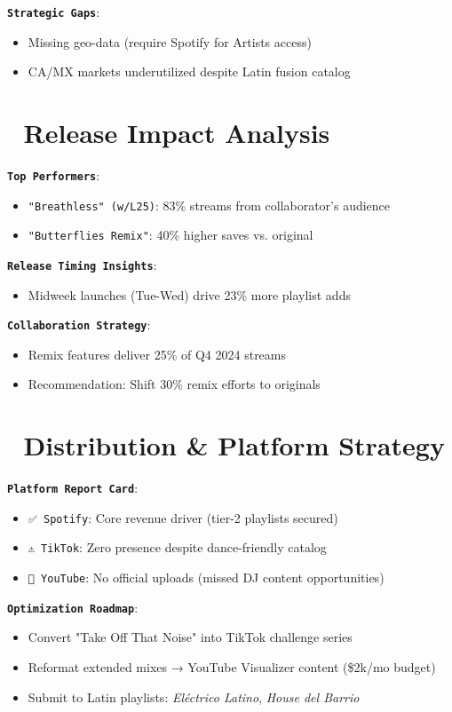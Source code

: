 \documentclass{article}
\begin{document}
\texttt{\textbf{Strategic Gaps}}:  
\begin{itemize}  
\item Missing geo-data (require Spotify for Artists access)  
\item CA/MX markets underutilized despite Latin fusion catalog  
\end{itemize}  

\section*{\normalsize 🎵 Release Impact Analysis}  
\texttt{\textbf{Top Performers}}:  
\begin{itemize}  
\item \texttt{"Breathless" (w/L25)}: 83\% streams from collaborator's audience  
\item \texttt{"Butterflies Remix"}: 40\% higher saves vs. original  
\end{itemize}  

\texttt{\textbf{Release Timing Insights}}:  
\begin{itemize}  
item Summer releases (Jun-Jul) sustain +18\% longer than fall drops  
\item Midweek launches (Tue-Wed) drive 23\% more playlist adds  
\end{itemize}  

\texttt{\textbf{Collaboration Strategy}}:  
\begin{itemize}  
\item Remix features deliver 25\% of Q4 2024 streams  
\item Recommendation: Shift 30\% remix efforts to originals  
\end{itemize}  

\section*{\normalsize 📱 Distribution \& Platform Strategy}  
\texttt{\textbf{Platform Report Card}}:  
\begin{itemize}  
\item \texttt{✅ Spotify}: Core revenue driver (tier-2 playlists secured)  
\item \texttt{⚠️ TikTok}: Zero presence despite dance-friendly catalog  
\item \texttt{🚫 YouTube}: No official uploads (missed DJ content opportunities)  
\end{itemize}  

\texttt{\textbf{Optimization Roadmap}}:  
\begin{itemize}  
\item Convert "Take Off That Noise" into TikTok challenge series  
\item Reformat extended mixes → YouTube Visualizer content (\$2k/mo budget)  
\item Submit to Latin playlists: \textit{Eléctrico Latino}, \textit{House del Barrio}  
\end{itemize}  
\end{document}
